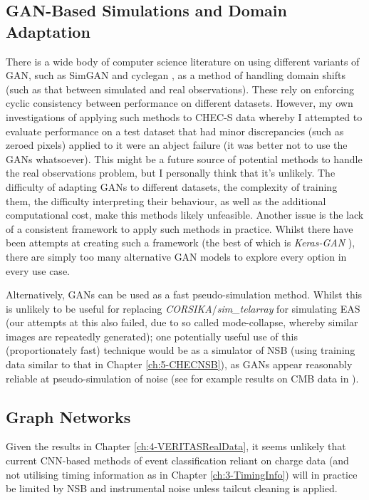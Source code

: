 \subsection{GAN-Based Simulations and Domain Adaptation}
There is a wide body of computer science literature on using different variants of GAN, such as SimGAN \cite{simgan} and cyclegan \cite{cyclegan}, as a method of handling domain shifts (such as that between simulated and real observations). These rely on enforcing cyclic consistency between performance on different datasets. However, my own investigations of applying such methods to CHEC-S data whereby I attempted to evaluate performance on a test dataset that had minor discrepancies (such as zeroed pixels) applied to it were an abject failure (it was better not to use the GANs whatsoever). This might be a future source of potential methods to handle the real observations problem, but I personally think that it's unlikely. The difficulty of adapting GANs to different datasets, the complexity of training them, the difficulty interpreting their behaviour, as well as the additional computational cost, make this methods likely unfeasible. Another issue is the lack of a consistent framework to apply such methods in practice. Whilst there have been attempts at creating such a framework (the best of which is \textit{Keras-GAN} \cite{kerasgan}), there are simply too many alternative GAN models to explore every option in every use case. 

Alternatively, GANs can be used as a fast pseudo-simulation method. Whilst this is unlikely to be useful for replacing \textit{CORSIKA}/\textit{sim\_telarray} for simulating EAS (our attempts at this also failed, due to so called mode-collapse, whereby similar images are repeatedly generated); one potentially useful use of this (proportionately fast) technique would be as a simulator of NSB (using training data similar to that in Chapter \ref{ch:5-CHECNSB}), as GANs appear reasonably reliable at pseudo-simulation of noise (see for example results on CMB data in \cite{darshgan}). 

\subsection{Graph Networks}
Given the results in Chapter \ref{ch:4-VERITASRealData}, it seems unlikely that current CNN-based methods of event classification reliant on charge data (and not utilising timing information as in Chapter \ref{ch:3-TimingInfo}) will in practice be limited by NSB and instrumental noise unless tailcut cleaning is applied.

